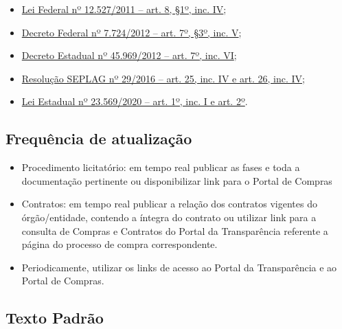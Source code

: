\documentclass[]{book}
\providecommand{\tightlist}{%
  \setlength{\itemsep}{0pt}\setlength{\parskip}{0pt}}
\begin{document}
\begin{itemize}
\tightlist
\item
  \href{http://www.planalto.gov.br/ccivil_03/_ato2011-2014/2011/lei/l12527.htm\#art8}{Lei Federal nº 12.527/2011 -- art. 8, §1º, inc. IV};
\item
  \href{http://www.planalto.gov.br/ccivil_03/_ato2011-2014/2012/decreto/d7724.htm\#art7}{Decreto Federal nº 7.724/2012 -- art. 7º, §3º, inc. V};
\item
  \href{https://www.almg.gov.br/consulte/legislacao/completa/completa.html?tipo=DEC\&num=45969\&ano=2012}{Decreto Estadual nº 45.969/2012 -- art. 7º, inc. VI};
\item
  \href{http://www.planejamento.mg.gov.br/sites/default/files/documentos/resolucao_sitios_seplag_29_de_05_07_2016_1.pdf}{Resolução SEPLAG nº 29/2016 -- art. 25, inc. IV e art. 26, inc. IV};
\item
  \href{https://www.almg.gov.br/consulte/legislacao/completa/completa.html?tipo=LEI\&num=23569\&comp=\&ano=2020}{Lei Estadual nº 23.569/2020 -- art. 1º, inc. I e art. 2º}.
\end{itemize}

\hypertarget{frequuxeancia-de-atualizauxe7uxe3o-5}{%
\subsection{Frequência de atualização}\label{frequuxeancia-de-atualizauxe7uxe3o-5}}

\begin{itemize}
\tightlist
\item
  Procedimento licitatório: em tempo real publicar as fases e toda a documentação pertinente ou disponibilizar link para o Portal de Compras
\item
  Contratos: em tempo real publicar a relação dos contratos vigentes do órgão/entidade, contendo a íntegra do contrato ou utilizar link para a consulta de Compras e Contratos do Portal da Transparência referente a página do processo de compra correspondente.
\item
  Periodicamente, utilizar os links de acesso ao Portal da Transparência e ao Portal de Compras.
\end{itemize}

\hypertarget{texto-padruxe3o-6}{%
\subsection{Texto Padrão}\label{texto-padruxe3o-6}}
\end{document}
